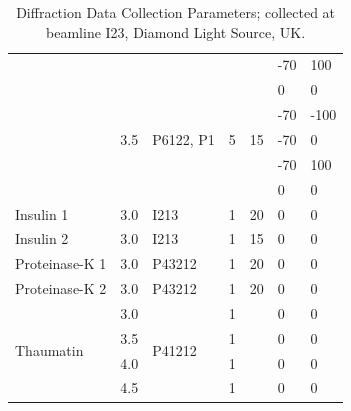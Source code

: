\begin{table}[]
{\begin{tabular}{@{}lllllll@{}}
                           &                      &                           &                    &                    & -70   & 100  \\ \cmidrule(l){2-7} 
                                & \multirow{5}{*}{3.5} & \multirow{5}{*}{P6122, P1} & \multirow{5}{*}{5} & \multirow{5}{*}{15} & 0   & 0    \\
                           &                      &                           &                    &                    & -70   & -100 \\
                           &                      &                           &                    &                    & -70   & 0    \\
                           &                      &                           &                    &                    & -70   & 100  \\
                           &                      &                           &                    &                    & 0     & 0    \\ \midrule
Insulin 1                  & 3.0                  & I213                      & 1                  & 20                 & 0     & 0    \\ \midrule
Insulin 2                  & 3.0                  & I213                      & 1                  & 15                 & 0     & 0    \\ \midrule
Proteinase-K 1             & 3.0                  & P43212                    & 1                  & 20                 & 0     & 0    \\ \midrule
Proteinase-K 2             & 3.0                  & P43212                    & 1                  & 20                 & 0     & 0    \\ \midrule
\multirow{4}{*}{Thaumatin} & 3.0                  & \multirow{4}{*}{P41212}   & 1                  &                    & 0     & 0    \\
                           & 3.5                  &                           & 1                  &                    & 0     & 0    \\
                           & 4.0                  &                           & 1                  &                    & 0     & 0    \\
                           & 4.5                  &                           & 1                  &                    & 0     & 0    \\ \bottomrule
\end{tabular}%
}
\caption{Diffraction Data Collection Parameters; collected at beamline I23, Diamond Light Source, UK.}
\label{diffration_table}
\end{table}


